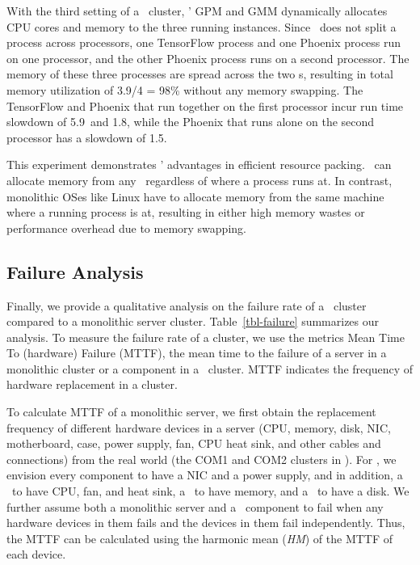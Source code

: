 \documentclass[10pt,times,twocolumn]{z2-article}
\begin{document}
{{{{{{{With the third setting of a \lego\ cluster, \lego' GPM and GMM dynamically allocates CPU cores and memory to 
the three running instances. 
Since \lego\ does not split a process across processors, one TensorFlow process and one Phoenix process
run on one processor, and the other Phoenix process runs on a second processor.
The memory of these three processes are spread across the two \mcomponent s,
resulting in total memory utilization of 3.9/4 = 98\% without any memory swapping.
The TensorFlow and Phoenix that run together on the first processor incur run time slowdown of 
5.9\x\ and 1.8\x, while the Phoenix that runs alone on the second processor has a slowdown of 1.5\x.

This experiment demonstrates \lego' advantages in efficient resource packing.
\lego\ can allocate memory from any \mcomponent\ regardless of where a process runs at.
In contrast, monolithic OSes like Linux have to allocate memory from the same machine where
a running process is at, resulting in either high memory wastes or performance overhead due to memory swapping.
\fi

\subsection{Failure Analysis}
\label{sec:failure-results}
Finally, we provide a qualitative analysis on the failure rate of a \lego\ cluster compared to a monolithic server cluster.
Table~\ref{tbl-failure} summarizes our analysis.
To measure the failure rate of a cluster, we use the metrics Mean Time To (hardware) Failure (MTTF), 
the mean time to the failure of a server in a monolithic cluster
or a component in a \lego\ cluster.
MTTF indicates the frequency of hardware replacement in a cluster.

To calculate MTTF of a monolithic server, we first obtain the replacement frequency of different hardware devices in a server
(CPU, memory, disk, NIC, motherboard, case, power supply, fan, CPU heat sink, and other cables and connections)
from the real world (the COM1 and COM2 clusters in \cite{Failure-Disk-FAST07}).
For \lego, we envision every component to have a NIC and a power supply, 
and in addition, a \pcomponent\ to have CPU, fan, and heat sink, a \mcomponent\ to have memory, and a \scomponent\ to have a disk.
We further assume both a monolithic server and a \lego\ component to fail when any hardware devices in them fails
and the devices in them fail independently.
Thus, the MTTF can be calculated using the harmonic mean ({\em HM}) 
of the MTTF of each device.

}}}}}}}
\end{document}
